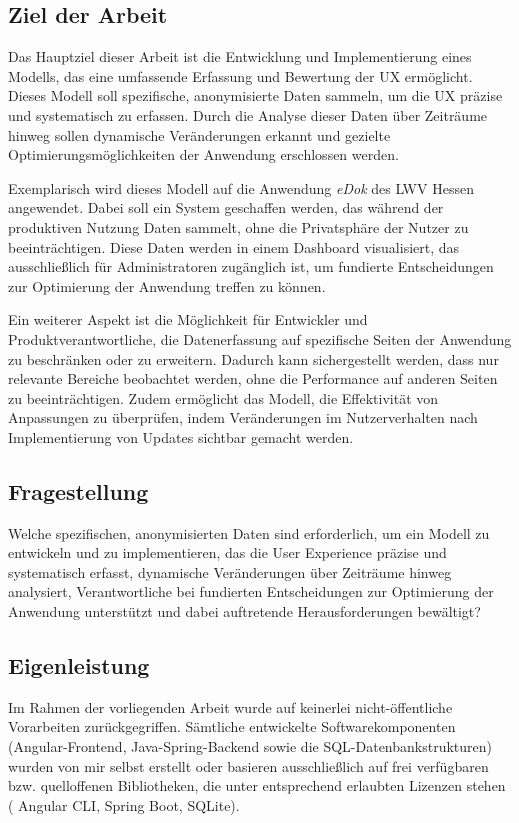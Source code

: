 \documentclass[12pt,oneside]{article}
\begin{document}
\subsection{Ziel der Arbeit}

Das Hauptziel dieser Arbeit ist die Entwicklung und Implementierung eines Modells, das eine umfassende Erfassung und Bewertung der UX ermöglicht. Dieses Modell soll spezifische, anonymisierte Daten sammeln, um die UX präzise und systematisch zu erfassen. Durch die Analyse dieser Daten über Zeiträume hinweg sollen dynamische Veränderungen erkannt und gezielte Optimierungsmöglichkeiten der Anwendung erschlossen werden.

Exemplarisch wird dieses Modell auf die Anwendung \textit{eDok} des LWV Hessen angewendet. Dabei soll ein System geschaffen werden, das während der produktiven Nutzung Daten sammelt, ohne die Privatsphäre der Nutzer zu beeinträchtigen. Diese Daten werden in einem Dashboard visualisiert, das ausschließlich für Administratoren zugänglich ist, um fundierte Entscheidungen zur Optimierung der Anwendung treffen zu können.

Ein weiterer Aspekt ist die Möglichkeit für Entwickler und Produktverantwortliche, die Datenerfassung auf spezifische Seiten der Anwendung zu beschränken oder zu erweitern. Dadurch kann sichergestellt werden, dass nur relevante Bereiche beobachtet werden, ohne die Performance auf anderen Seiten zu beeinträchtigen. Zudem ermöglicht das Modell, die Effektivität von Anpassungen zu überprüfen, indem Veränderungen im Nutzerverhalten nach Implementierung von Updates sichtbar gemacht werden.

\subsection{Fragestellung}

Welche spezifischen, anonymisierten Daten sind erforderlich, um ein Modell zu entwickeln und zu implementieren, das die User Experience präzise und systematisch erfasst, dynamische Veränderungen über Zeiträume hinweg analysiert, Verantwortliche bei fundierten Entscheidungen zur Optimierung der Anwendung unterstützt und dabei auftretende Herausforderungen bewältigt?
\subsection{Eigenleistung}
Im Rahmen der vorliegenden Arbeit wurde auf keinerlei nicht-öffentliche Vorarbeiten zurückgegriffen. Sämtliche entwickelte Softwarekomponenten (Angular-Frontend, Java-Spring-Backend sowie die SQL-Datenbankstrukturen) wurden von mir selbst erstellt oder basieren ausschließlich auf frei verfügbaren bzw. quelloffenen Bibliotheken, die unter entsprechend erlaubten Lizenzen stehen ( Angular CLI, Spring Boot, SQLite).
\end{document}
